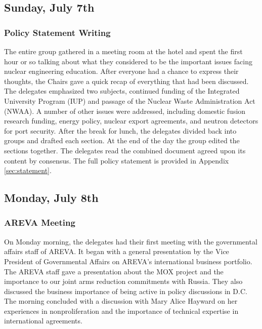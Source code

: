 

\subsection*{Sunday, July 7th}

\subsubsection*{Policy Statement Writing}

The entire group gathered in a meeting room at the hotel and spent the first
hour or so talking about what they considered to be the important issues facing
nuclear engineering education. After everyone had a chance to express their
thoughts, the Chairs gave a quick recap of everything that had been
discussed. The delegates emphasized two subjects, continued funding of the
Integrated University Program (IUP) and passage of the Nuclear Waste
Administration Act (NWAA). A number of other issues were addressed, including
domestic fusion research funding, energy policy, nuclear export agreements, and
neutron detectors for port security. After the break for lunch, the delegates
divided back into groups and drafted each section. At the end of the day the
group edited the sections together. The delegates read the combined document
agreed upon its content by consensus. The full policy statement is provided in
Appendix \ref{sec:statement}.

\subsection*{Monday, July 8th}

\subsubsection*{AREVA Meeting} 

On Monday morning, the delegates had their first meeting with the governmental
affairs staff of AREVA. It began with a general presentation by the Vice
President of Governmental Affairs on AREVA's international business
portfolio. The AREVA staff gave a presentation about the MOX project and the
importance to our joint arms reduction commitments with Russia. They also
discussed the business importance of being active in policy discussions in
D.C. The morning concluded with a discussion with Mary Alice Hayward on her
experiences in nonproliferation and the importance of technical expertise in
international agreements.

